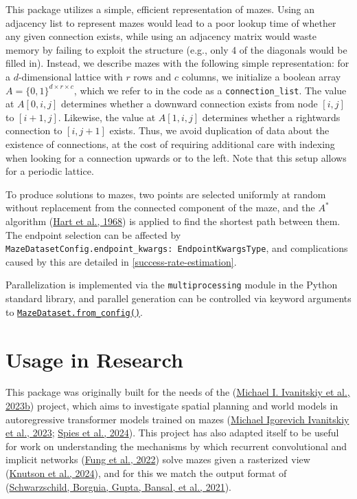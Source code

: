 \documentclass[10pt,a4paper,onecolumn]{article}
\begin{document}
This package utilizes a simple, efficient representation of mazes. Using
an adjacency list to represent mazes would lead to a poor lookup time of
whether any given connection exists, while using an adjacency matrix
would waste memory by failing to exploit the structure (e.g., only 4 of
the diagonals would be filled in). Instead, we describe mazes with the
following simple representation: for a \(d\)-dimensional lattice with
\(r\) rows and \(c\) columns, we initialize a boolean array
\(A = \{0, 1\}^{d \times r \times c}\), which we refer to in the code as
a \texttt{connection\_list}. The value at \(A[0,i,j]\) determines
whether a downward connection exists from node \([i,j]\) to
\([i+1, j]\). Likewise, the value at \(A[1,i,j]\) determines whether a
rightwards connection to \([i, j+1]\) exists. Thus, we avoid duplication
of data about the existence of connections, at the cost of requiring
additional care with indexing when looking for a connection upwards or
to the left. Note that this setup allows for a periodic lattice.

To produce solutions to mazes, two points are selected uniformly at
random without replacement from the connected component of the maze, and
the \(A^*\) algorithm (\protect\hyperlink{ref-A_star}{Hart et al.,
1968}) is applied to find the shortest path between them. The endpoint
selection can be affected by
\texttt{MazeDatasetConfig.endpoint\_kwargs:\ EndpointKwargsType}, and
complications caused by this are detailed in
\autoref{success-rate-estimation}.

Parallelization is implemented via the \texttt{multiprocessing} module
in the Python standard library, and parallel generation can be
controlled via keyword arguments to
\href{https://understanding-search.github.io/maze-dataset/maze_dataset.html\#MazeDataset.from_config}{\texttt{MazeDataset.from\_config()}}.

\hypertarget{usage-in-research}{%
\section{Usage in Research}\label{usage-in-research}}

This package was originally built for the needs of the
(\protect\hyperlink{ref-maze-transformer-github}{Michael I. Ivanitskiy
et al., 2023b}) project, which aims to investigate spatial planning and
world models in autoregressive transformer models trained on mazes
(\protect\hyperlink{ref-ivanitskiy2023structuredworldreps}{Michael
Igorevich Ivanitskiy et al., 2023};
\protect\hyperlink{ref-spies2024causalworldmodels}{Spies et al., 2024}).
This project has also adapted itself to be useful for work on
understanding the mechanisms by which recurrent convolutional and
implicit networks (\protect\hyperlink{ref-fung2022jfb}{Fung et al.,
2022}) solve mazes given a rasterized view
(\protect\hyperlink{ref-knutson2024logicalextrapolation}{Knutson et al.,
2024}), and for this we match the output format of
(\protect\hyperlink{ref-easy_to_hard}{Schwarzschild, Borgnia, Gupta,
Bansal, et al., 2021}).
\end{document}
